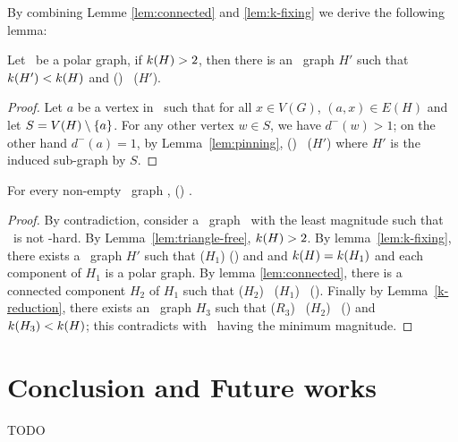 By combining Lemme \ref{lem:connected} and \ref{lem:k-fixing} 
we derive the following lemma:

\begin{lemma} \label{lem:k-reduction}
Let \mH\ be a polar graph, if \(k(H) > 2\), then
there is an \RBA\ graph \(H'\) such that \(k(H') < k(H)\)
and \chom(\mH) \mapge\ \chom(\(H'\))\@.
\end{lemma}

\begin{proof}
Let \(a\) be a vertex in \mH\ such that for all \(x\in V(G)\), \((a,x)\in E(H)\) and
let \(S = V(H) \setminus \{{a}\}\).
For any other vertex \(w \in S\), we have \(d^-(w) > 1\); on the other hand \(d^-(a)=1\),
by Lemma~\ref{lem:pinning}, \chom(\mH) \mapge\ \chom(\(H'\)) where \(H'\) is 
the induced sub-graph by \(S\)\@.
\end{proof}

\begin{theorem}
For every non-empty \RBA\ graph \mH, \chom(\mH) \mapge \cbis\@.
\end{theorem}


\begin{proof}
By contradiction, consider a \RBA\ graph \mH\ with the least magnitude
such that \mH\ is not \cbis -hard. By Lemma~\ref{lem:triangle-free}, \(k(H) > 2\)\@. 
By lemma~\ref{lem:k-fixing}, there exists a \RBA\ graph \(H'\) such that 
\chom(\(H_1\)) \maple \chom(\mH) and  
and \(k(H)=k(H_1)\) and each component of \(H_1\) is a polar graph. 
By lemma \ref{lem:connected}, there is a connected component \(H_2\)
of \(H_1\) such that \chom(\(H_2\)) \maple\ \chom(\(H_1\)) \maple\ \chom(\mH)\@.
Finally  by Lemma~\ref{k-reduction}, there exists an \RBA\ graph \(H_3\) such that 
\chom(\(R_3\)) \maple\ \chom(\(H_2\)) \maple\ \chom(\mH) 
and \(k(H_3) < k(H)\); this contradicts with \mH\ having the minimum magnitude.
\end{proof}

\section{Conclusion and Future works}
TODO